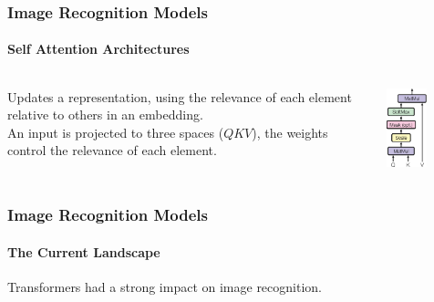 \begin{frame}[t]
    \frametitle{Image Recognition Models}
    \framesubtitle{Self Attention Architectures}
    \begin{columns}
         {\footnotesize Updates a representation, using the relevance of each element relative to others in an 
         embedding.\\
         An input is projected to three spaces ($Q K V$), the weights control the relevance of each 
         element.}
        \begin{center}
            \includegraphics[width=0.5\textwidth]{fig/rel/imrecon/img/scaled_dotproduct.pdf}
        \end{center}
        
    \end{columns}
    
\end{frame}
\begin{frame}[t]
    \frametitle{Image Recognition Models}
    \framesubtitle{The Current Landscape}
    Transformers had a strong impact on image recognition. 
    
    
\end{frame}